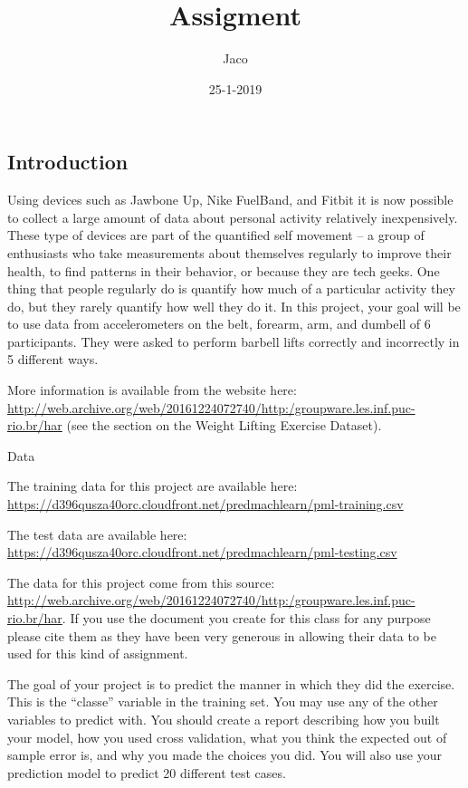 \documentclass[]{article}
\title{Assigment}
\author{Jaco}
\date{25-1-2019}
\begin{document}
\maketitle

\subsection{Introduction}\label{introduction}

Using devices such as Jawbone Up, Nike FuelBand, and Fitbit it is now
possible to collect a large amount of data about personal activity
relatively inexpensively. These type of devices are part of the
quantified self movement -- a group of enthusiasts who take measurements
about themselves regularly to improve their health, to find patterns in
their behavior, or because they are tech geeks. One thing that people
regularly do is quantify how much of a particular activity they do, but
they rarely quantify how well they do it. In this project, your goal
will be to use data from accelerometers on the belt, forearm, arm, and
dumbell of 6 participants. They were asked to perform barbell lifts
correctly and incorrectly in 5 different ways.

More information is available from the website here:
\url{http://web.archive.org/web/20161224072740/http:/groupware.les.inf.puc-rio.br/har}
(see the section on the Weight Lifting Exercise Dataset).

Data

The training data for this project are available here:
\url{https://d396qusza40orc.cloudfront.net/predmachlearn/pml-training.csv}

The test data are available here:
\url{https://d396qusza40orc.cloudfront.net/predmachlearn/pml-testing.csv}

The data for this project come from this source:
\url{http://web.archive.org/web/20161224072740/http:/groupware.les.inf.puc-rio.br/har}.
If you use the document you create for this class for any purpose please
cite them as they have been very generous in allowing their data to be
used for this kind of assignment.

The goal of your project is to predict the manner in which they did the
exercise. This is the ``classe'' variable in the training set. You may
use any of the other variables to predict with. You should create a
report describing how you built your model, how you used cross
validation, what you think the expected out of sample error is, and why
you made the choices you did. You will also use your prediction model to
predict 20 different test cases.
\end{document}
